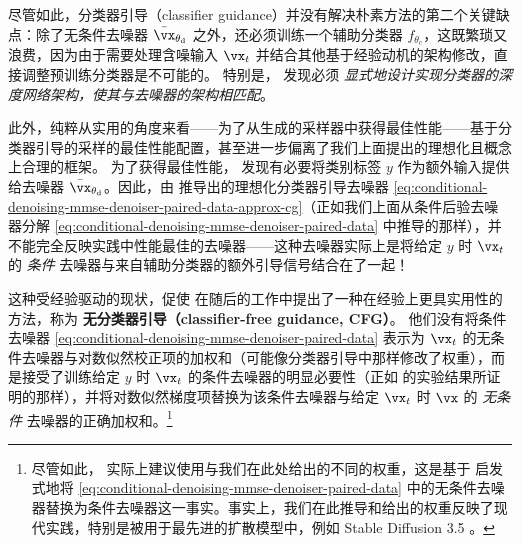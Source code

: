 \documentclass[../../book-main_zh.tex]{subfiles}
\begin{document}
尽管如此，分类器引导（classifier guidance）并没有解决朴素方法的第二个关键缺点：除了无条件去噪器 $\bar{\vx}_{\theta_{\mathrm{d}}}$ 之外，还必须训练一个辅助分类器 $f_{\theta_{\mathrm{c}}}$，这既繁琐又浪费，因为由于需要处理含噪输入 $\vx_t$ 并结合其他基于经验动机的架构修改，直接调整预训练分类器是不可能的。
特别是，\citet{Dhariwal2021-hg} 发现必须 \textit{显式地设计实现分类器的深度网络架构，使其与去噪器的架构相匹配}。

此外，纯粹从实用的角度来看——为了从生成的采样器中获得最佳性能——基于分类器引导的采样的最佳性能配置，甚至进一步偏离了我们上面提出的理想化且概念上合理的框架。
为了获得最佳性能，\citet{Dhariwal2021-hg} 发现有必要将类别标签 $y$ 作为额外输入提供给去噪器 $\bar{\vx}_{\theta_{\mathrm{d}}}$。因此，由 \citet{Dhariwal2021-hg} 推导出的理想化分类器引导去噪器 \eqref{eq:conditional-denoising-mmse-denoiser-paired-data-approx-cg}（正如我们上面从条件后验去噪器分解 \eqref{eq:conditional-denoising-mmse-denoiser-paired-data} 中推导的那样），并不能完全反映实践中性能最佳的去噪器——这种去噪器实际上是将给定 $y$ 时 $\vx_t$ 的 \textit{条件} 去噪器与来自辅助分类器的额外引导信号结合在了一起！

这种受经验驱动的现状，促使 \citet{Ho2022-ry} 在随后的工作中提出了一种在经验上更具实用性的方法，称为 \textbf{无分类器引导（classifier-free guidance, CFG）}。
他们没有将条件去噪器 \eqref{eq:conditional-denoising-mmse-denoiser-paired-data} 表示为 $\vx_t$ 的无条件去噪器与对数似然校正项的加权和（可能像分类器引导中那样修改了权重），而是接受了训练给定 $y$ 时 $\vx_t$ 的条件去噪器的明显必要性（正如 \citet{Dhariwal2021-hg} 的实验结果所证明的那样），并将对数似然梯度项替换为该条件去噪器与给定 $\vx_t$ 时 $\vx$ 的 \textit{无条件} 去噪器的正确加权和。\footnote{尽管如此，\textcite{Ho2022-ry} 实际上建议使用与我们在此处给出的不同的权重，这是基于 \textcite{Dhariwal2021-hg} 启发式地将 \eqref{eq:conditional-denoising-mmse-denoiser-paired-data} 中的无条件去噪器替换为条件去噪器这一事实。事实上，我们在此推导和给出的权重反映了现代实践，特别是被用于最先进的扩散模型中，例如 Stable Diffusion 3.5 \cite{DBLP:conf/icml/EsserKBEMSLLSBP24}。}
\end{document}
